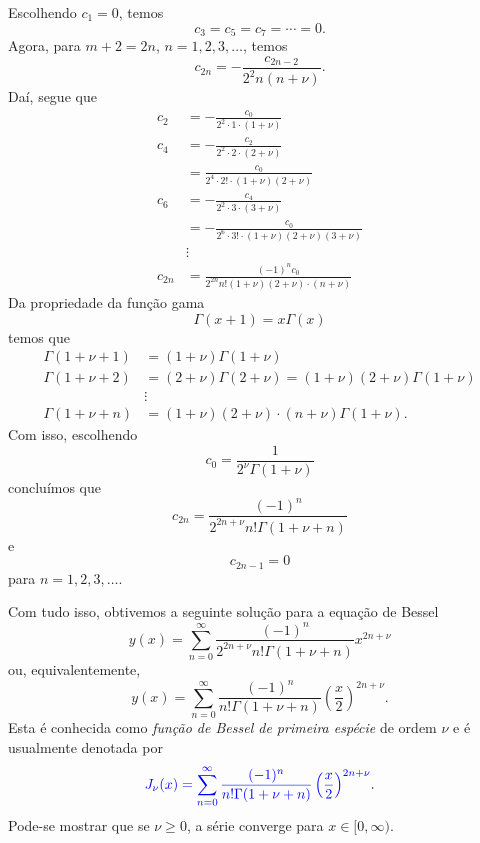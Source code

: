 Escolhendo $c_1=0$, temos
\begin{equation}
  c_3=c_5=c_7=\cdots=0.
\end{equation}
Agora, para $m+2=2n$, $n=1,2,3,\ldots$, temos
\begin{equation}
  c_{2n} = -\frac{c_{2n-2}}{2^2n(n+\nu)}.
\end{equation}
Daí, segue que
\begin{align}
  c_2 &= -\frac{c_0}{2^2\cdot 1\cdot (1+\nu)}\\
  c_4 &= -\frac{c_2}{2^2\cdot 2\cdot (2+\nu)}\\
      &= \frac{c_0}{2^4\cdot 2!\cdot (1+\nu)(2+\nu)}\\
  c_6 &= -\frac{c_4}{2^2\cdot 3\cdot (3+\nu)}\\
      &= -\frac{c_0}{2^6\cdot 3!\cdot (1+\nu)(2+\nu)(3+\nu)}\\
      &\vdots\\
  c_{2n} &= \frac{(-1)^nc_0}{2^{2n}n!(1+\nu)(2+\nu)\cdot(n+\nu)}
\end{align}
Da propriedade da função gama
\begin{equation}
  \Gamma(x+1) = x\Gamma(x)
\end{equation}
temos que
\begin{align}
  \Gamma(1+\nu+1) &= (1+\nu)\Gamma(1+\nu)\\
  \Gamma(1+\nu+2) &= (2+\nu)\Gamma(2+\nu)=(1+\nu)(2+\nu)\Gamma(1+\nu)\\
                &\vdots\\
  \Gamma(1+\nu+n) &= (1+\nu)(2+\nu)\cdot(n+\nu)\Gamma(1+\nu). 
\end{align}
Com isso, escolhendo
\begin{equation}
  c_0 = \frac{1}{2^\nu\Gamma(1+\nu)}
\end{equation}
concluímos que
\begin{equation}
  c_{2n} = \frac{(-1)^n}{2^{2n+\nu}n!\Gamma(1+\nu+n)}
\end{equation}
e
\begin{equation}
  c_{2n-1}=0
\end{equation}
para $n=1,2,3,\ldots$.

Com tudo isso, obtivemos a seguinte solução para a equação de Bessel
\begin{equation}
  y(x) = \sum_{n=0}^\infty \frac{(-1)^n}{2^{2n+\nu}n!\Gamma(1+\nu+n)}x^{2n+\nu}
\end{equation}
ou, equivalentemente,
\begin{equation}
  y(x) = \sum_{n=0}^\infty \frac{(-1)^n}{n!\Gamma(1+\nu+n)}\left(\frac{x}{2}\right)^{2n+\nu}.
\end{equation}
Esta é conhecida como \emph{função de Bessel de primeira espécie} de ordem $\nu$ e é usualmente denotada por
\begin{equation}\label{eq:bessel-1esp-nu}
  {\color{blue}J_\nu(x) = \sum_{n=0}^\infty \frac{(-1)^n}{n!\Gamma(1+\nu+n)}\left(\frac{x}{2}\right)^{2n+\nu}}. 
\end{equation}
Pode-se mostrar que se $\nu\geq 0$, a série converge para $x\in [0, \infty)$.

